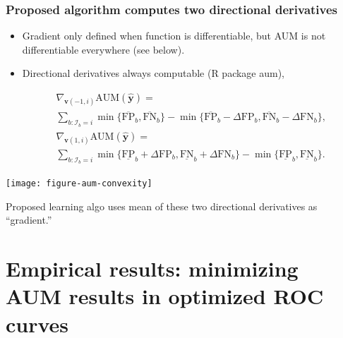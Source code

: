\documentclass[t]{beamer}
\begin{document}
\begin{frame}
  \frametitle{Proposed algorithm computes two directional derivatives }

  \begin{itemize}
  \item Gradient only defined when function is differentiable, but AUM
    is not differentiable everywhere (see below).
  \item Directional derivatives always computable (R package aum),
  \end{itemize}
\begin{eqnarray*}
  &&\nabla_{\mathbf v(-1,i)} \text{AUM}(\mathbf{\hat y}) = \\
  &&\sum_{b: \mathcal I_b = i}
  \min\{
  \overline{\text{FP}}_b , 
  \overline{\text{FN}}_b 
  \}
  -
  \min\{
  \overline{\text{FP}}_b - \Delta\text{FP}_b, 
  \overline{\text{FN}}_b - \Delta\text{FN}_b
  \},\\
  &&\nabla_{\mathbf v(1,i)} \text{AUM}(\mathbf{\hat y}) = \\
  &&\sum_{b: \mathcal I_b = i}
  \min\{
  \underline{\text{FP}}_b + \Delta\text{FP}_b, 
  \underline{\text{FN}}_b + \Delta\text{FN}_b
  \}
  -
  \min\{
  \underline{\text{FP}}_b , 
  \underline{\text{FN}}_b 
     \}.
\end{eqnarray*}  

\parbox{2in}{ \texttt{[image: figure-aum-convexity]} }
\parbox{2in}{ Proposed learning algo uses mean of these two
  directional derivatives as ``gradient.''  }

\end{frame}

\section{Empirical results: minimizing AUM results in optimized ROC curves}
\end{document}
